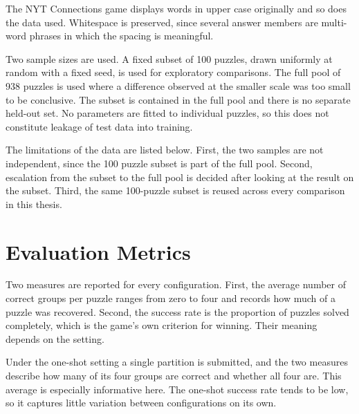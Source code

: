 The NYT Connections game displays words in upper case originally and so does the data used. Whitespace is preserved, since several answer members are multi-word phrases in which the spacing is meaningful.

Two sample sizes are used. A fixed subset of 100 puzzles, drawn uniformly at random with a fixed seed, is used for exploratory comparisons. The full pool of 938 puzzles is used where a difference observed at the smaller scale was too small to be conclusive. The subset is contained in the full pool and there is no separate held-out set. No parameters are fitted to individual puzzles, so this does not constitute leakage of test data into training. 

The limitations of the data are listed below. 
First, the two samples are not independent, since the 100 puzzle subset is part of the full pool. Second, escalation from the subset to the full pool is decided after looking at the result on the subset. Third, the same 100-puzzle subset is reused across every comparison in this thesis.

\section{Evaluation Metrics}
\label{sec:metrics}

Two measures are reported for every configuration. First, the average number of correct groups per puzzle ranges from zero to four and records how much of a puzzle was recovered. Second, the success rate is the proportion of puzzles solved completely, which is the game's own criterion for winning. Their meaning depends on the setting.

Under the one-shot setting a single partition is submitted, and the two measures describe how many of its four groups are correct and whether all four are. This average is especially informative here. The one-shot success rate tends to be low, so it captures little variation between configurations on its own.

